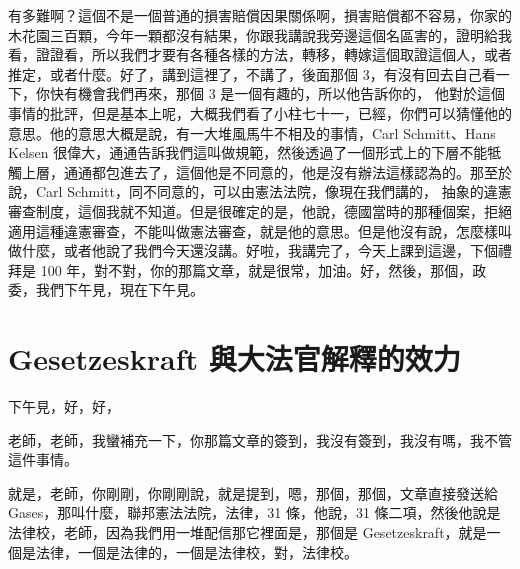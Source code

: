 \hypertarget{w05:cue:351}{}有多難啊？這個不是一個普通的損害賠償因果關係啊，損害賠償都不容易，你家的木花園三百顆，今年一顆都沒有結果，你跟我講說我旁邊這個名區害的，證明給我看，證證看，所以我們才要有各種各樣的方法，轉移，轉嫁這個取證這個人，或者推定，或者什麼。好了，講到這裡了，不講了，後面那個 3，有沒有回去自己看一下，你快有機會我們再來，那個 3 是一個有趣的，所以他告訴你的，
\hypertarget{w05:cue:352}{}他對於這個事情的批評，但是基本上呢，大概我們看了小柱七十一，已經，你們可以猜懂他的意思。他的意思大概是說，有一大堆風馬牛不相及的事情，Carl Schmitt、Hans Kelsen 很偉大，通通告訴我們這叫做規範，然後透過了一個形式上的下層不能牴觸上層，通通都包進去了，這個他是不同意的，他是沒有辦法這樣認為的。那至於說，Carl Schmitt，同不同意的，可以由憲法法院，像現在我們講的，
\hypertarget{w05:cue:353}{}抽象的違憲審查制度，這個我就不知道。但是很確定的是，他說，德國當時的那種個案，拒絕適用這種違憲審查，不能叫做憲法審查，就是他的意思。但是他沒有說，怎麼樣叫做什麼，或者他說了我們今天還沒講。好啦，我講完了，今天上課到這邊，下個禮拜是 100 年，對不對，你的那篇文章，就是很常，加油。好，然後，那個，政委，我們下午見，現在下午見。

\section{Gesetzeskraft 與大法官解釋的效力}

\hypertarget{w05:cue:354}{}下午見，好，好，\par{}老師，老師，我蠻補充一下，你那篇文章的簽到，我沒有簽到，我沒有嗎，我不管這件事情。

\hypertarget{w05:cue:355}{}就是，老師，你剛剛，你剛剛說，就是提到，嗯，那個，那個，文章直接發送給 Gases，那叫什麼，聯邦憲法法院，法律，31 條，他說，31 條二項，然後他說是法律校，老師，因為我們用一堆配信那它裡面是，那個是 Gesetzeskraft，就是一個是法律，一個是法律的，一個是法律校，對，法律校。

